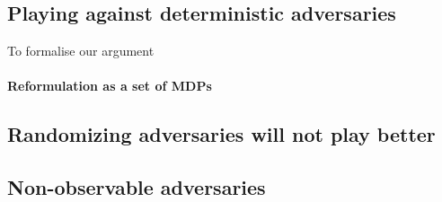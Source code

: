 \subsection{Playing against deterministic adversaries}
To formalise our argument
\paragraph{Reformulation as a set of MDPs}

\paragraph{}


\subsection{Randomizing adversaries will not play better}

\subsection{Non-observable adversaries}

